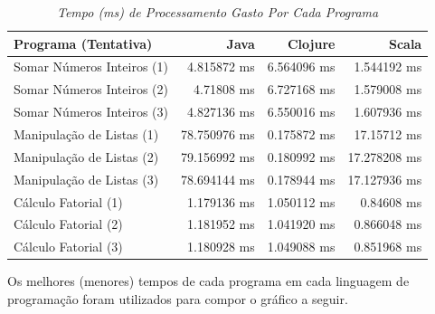     \begin{table}[htb] %
       \centering   %
       \large       %
       \setlength{\arrayrulewidth}{2\arrayrulewidth}  %
       \setlength{\belowcaptionskip}{10pt}  %
       \caption{\it Tempo (ms) de Processamento Gasto Por Cada Programa}
       \begin{tabular}{|l|r|r|r|} %
          \hline
          Programa (Tentativa) & Java & Clojure & Scala \\
          \hline \hline
          Somar Números Inteiros (1) & 4.815872 ms & 6.564096 ms & 1.544192 ms \\
          \hline
          Somar Números Inteiros (2) & 4.71808 ms & 6.727168 ms & 1.579008 ms \\
          \hline
          Somar Números Inteiros (3) & 4.827136 ms & 6.550016 ms & 1.607936 ms \\
          \hline
          Manipulação de Listas (1) & 78.750976 ms & 0.175872 ms & 17.15712 ms \\
          \hline
          Manipulação de Listas (2) & 79.156992 ms & 0.180992 ms & 17.278208 ms \\
          \hline
          Manipulação de Listas (3) & 78.694144 ms & 0.178944 ms & 17.127936 ms \\
          \hline
          Cálculo Fatorial (1) & 1.179136 ms & 1.050112 ms & 0.84608 ms \\
          \hline
          Cálculo Fatorial (2) & 1.181952 ms & 1.041920 ms & 0.866048 ms \\
          \hline
          Cálculo Fatorial (3) & 1.180928 ms & 1.049088 ms & 0.851968 ms \\
          \hline
       \end{tabular}
    \end{table}

    Os melhores (menores) tempos de cada programa em cada linguagem de programação foram utilizados para compor o gráfico a seguir.


